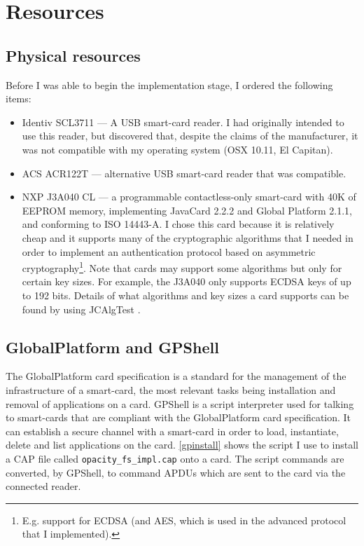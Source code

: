 \documentclass[12pt,a4paper,twoside,openright]{report}
\begin{document}
\section{Resources}



\subsection{Physical resources}

Before I was able to begin the implementation stage, I ordered the following items:

\begin{itemize}
\item Identiv SCL3711 --- A USB smart-card reader. I had originally intended to use this reader, but discovered that, despite the claims of the manufacturer, it was not compatible with my operating system (OSX 10.11, El Capitan).
\item ACS ACR122T --- alternative USB smart-card reader that was compatible.
\item NXP J3A040 CL --- a programmable contactless-only smart-card with 40K of EEPROM memory, implementing JavaCard 2.2.2 and Global Platform 2.1.1, and conforming to ISO 14443-A. I chose this card because it is relatively cheap and it supports many of the cryptographic algorithms that I needed in order to implement an authentication protocol based on asymmetric cryptography\footnote{E.g. support for ECDSA (and AES, which is used in the advanced protocol that I implemented).}. Note that cards may support some algorithms but only for certain key sizes. For example, the J3A040 only supports ECDSA keys of up to 192 bits. Details of what algorithms and key sizes a card supports can be found by using JCAlgTest \cite{jcalgtest}.
\end{itemize}

\subsection{GlobalPlatform and GPShell}

The GlobalPlatform card specification is a standard for the management of the infrastructure of a smart-card, the most relevant tasks being installation and removal of applications on a card. GPShell \cite{gpshell} is a script interpreter used for talking to smart-cards that are compliant with the GlobalPlatform card specification. It can establish a secure channel with a smart-card in order to load, instantiate, delete and list applications on the card. \autoref{gpinstall} shows the script I use to install a CAP file called \texttt{opacity\_fs\_impl.cap} onto a card. The script commands are converted, by GPShell, to command APDUs which are sent to the card via the connected reader.
\end{document}
